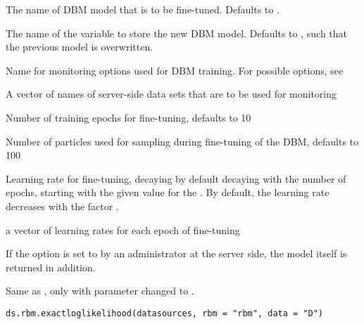 \begin{Arguments}
\begin{ldescription}
\item[\code{dbm}] The name of DBM model that is to be fine-tuned. Defaults to .

\item[\code{newobj}] The name of the variable to store the new DBM model.
Defaults to , such that the previous model is overwritten.

\item[\code{monitoring}] Name for monitoring options used for DBM training.
For possible options, see 

\item[\code{monitoringdata}] A vector of names of server-side data sets that are to be used for
monitoring

\item[\code{epochs}] Number of training epochs for fine-tuning, defaults to 10

\item[\code{nparticles}] Number of particles used for sampling during fine-tuning of the
DBM, defaults to 100

\item[\code{learningrate}] Learning rate for fine-tuning,
decaying by default decaying with the number of epochs,
starting with the given value for the .
By default, the learning rate decreases with the factor .

\item[\code{learningrates}] a vector of learning rates for each epoch of fine-tuning
\end{ldescription}
\end{Arguments}
%
\begin{Details}\relax
If the option  is set to 
by an administrator at the server side, the model itself is returned in addition.
\end{Details}
%
\begin{Description}\relax
Same as , only with parameter  changed to .
\end{Description}
%
\begin{Usage}
\begin{verbatim}
ds.rbm.exactloglikelihood(datasources, rbm = "rbm", data = "D")
\end{verbatim}
\end{Usage}
